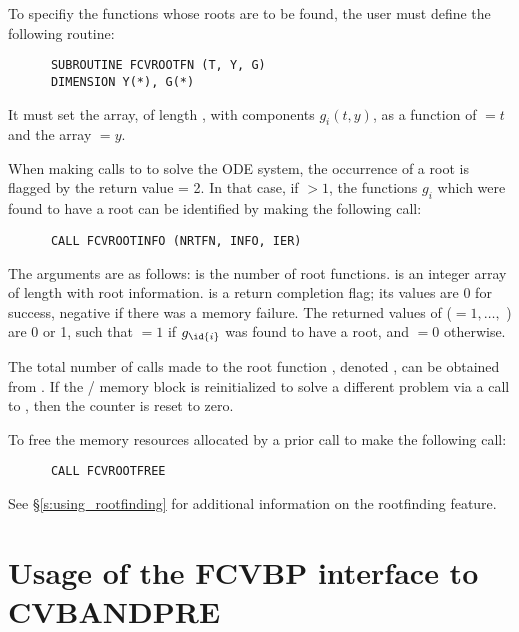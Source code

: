 To specifiy the functions whose roots are to be found, the user must
define the following routine:
\begin{verbatim}
      SUBROUTINE FCVROOTFN (T, Y, G)
      DIMENSION Y(*), G(*)
\end{verbatim}
It must set the  array, of length , with components $g_i(t,y)$,
as a function of  $= t$ and the array  $= y$.  

When making calls to  to solve the ODE system, the occurrence of
a root is flagged by the return value  = 2.  In that case, if
 $> 1$, the functions $g_i$ which were found to have a root can
be identified by making the following call:
\begin{verbatim}
      CALL FCVROOTINFO (NRTFN, INFO, IER)
\end{verbatim}
The arguments are as follows:  is the number of root functions.
 is an integer array of length  with root information.
 is a return completion flag; its values are $0$ for success, 
negative if there was a memory failure.  The returned values of 
($ = 1,\ldots,$ ) are 0 or 1, such that  $ = 1$
if $g_{\id{i}}$ was found to have a root, and  $ = 0$ otherwise.

The total number of calls made to the root function ,
denoted , can be obtained from .
If the {\fcvode}/{\cvode} memory block is reinitialized to solve a
different problem via a call to , then the counter
 is reset to zero.

To free the memory resources allocated by a prior call to  make
the following call:
\begin{verbatim}
      CALL FCVROOTFREE
\end{verbatim}
See \S\ref{s:using_rootfinding} for additional information on the
rootfinding feature.

\section{Usage of the FCVBP interface to CVBANDPRE}

